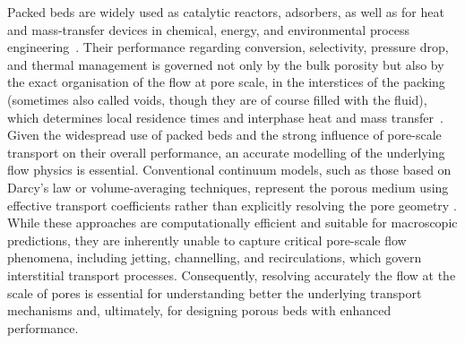Packed beds are widely used as catalytic reactors, adsorbers, as well as for heat and mass-transfer devices in chemical, energy, and environmental process engineering~\cite{Dixon,Aglave}. Their performance regarding conversion, selectivity, pressure drop, and thermal management is governed not only by the bulk porosity but also by the exact organisation of the flow at pore scale, in the interstices of the packing (sometimes also called voids, though they are of course filled with the fluid), which determines local residence times and interphase heat and mass transfer~\cite{Augier,freund2003numerical}. Given the widespread use of packed beds and the strong influence of pore-scale transport on their overall performance, an accurate modelling of the underlying flow physics is essential. Conventional continuum models, such as those based on Darcy's law or volume-averaging techniques, represent the porous medium using effective transport coefficients rather than explicitly resolving the pore geometry \cite{Zhisong}. While these approaches are computationally efficient and suitable for macroscopic predictions, they are inherently unable to capture critical pore-scale flow phenomena, including jetting, channelling, and recirculations, which govern interstitial transport processes. Consequently, resolving accurately the flow at the scale of pores is essential for understanding better the underlying transport mechanisms and, ultimately, for designing porous beds with enhanced performance.

